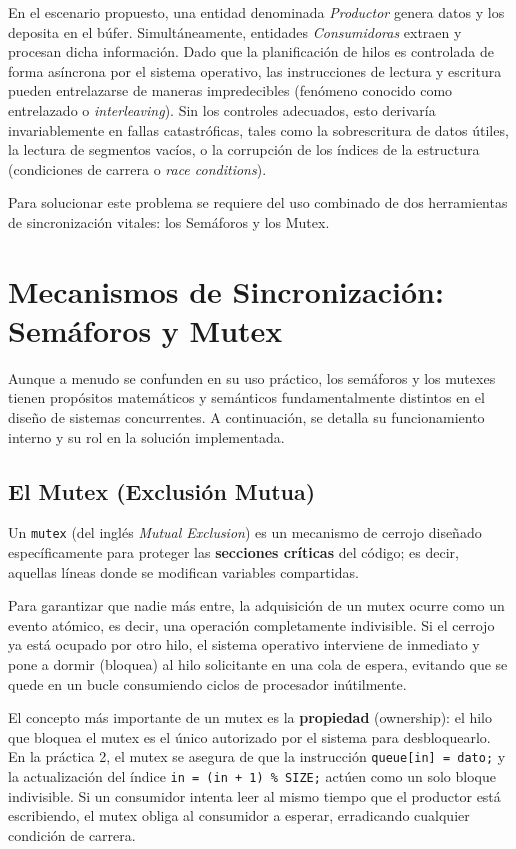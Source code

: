\documentclass[runningheads]{llncs}
\begin{document}
En el escenario propuesto, una entidad denominada \textit{Productor} genera datos y los deposita en el búfer. Simultáneamente, entidades \textit{Consumidoras} extraen y procesan dicha información. Dado que la planificación de hilos es controlada de forma asíncrona por el sistema operativo, las instrucciones de lectura y escritura pueden entrelazarse de maneras impredecibles (fenómeno conocido como entrelazado o \textit{interleaving}). Sin los controles adecuados, esto derivaría invariablemente en fallas catastróficas, tales como la sobrescritura de datos útiles, la lectura de segmentos vacíos, o la corrupción de los índices de la estructura (condiciones de carrera o \textit{race conditions}).

Para solucionar este problema se requiere del uso combinado de dos herramientas de sincronización vitales: los Semáforos y los Mutex.

\section{Mecanismos de Sincronización: Semáforos y Mutex}

Aunque a menudo se confunden en su uso práctico, los semáforos y los mutexes tienen propósitos matemáticos y semánticos fundamentalmente distintos en el diseño de sistemas concurrentes. A continuación, se detalla su funcionamiento interno y su rol en la solución implementada.

\subsection{El Mutex (Exclusión Mutua)}
Un \texttt{mutex} (del inglés \textit{Mutual Exclusion}) es un mecanismo de cerrojo diseñado específicamente para proteger las \textbf{secciones críticas} del código; es decir, aquellas líneas donde se modifican variables compartidas. 

Para garantizar que nadie más entre, la adquisición de un mutex ocurre como un evento atómico, es decir, una operación completamente indivisible. Si el cerrojo ya está ocupado por otro hilo, el sistema operativo interviene de inmediato y pone a dormir (bloquea) al hilo solicitante en una cola de espera, evitando que se quede en un bucle consumiendo ciclos de procesador inútilmente.

El concepto más importante de un mutex es la \textbf{propiedad} (ownership): el hilo que bloquea el mutex es el único autorizado por el sistema para desbloquearlo. En la práctica 2, el mutex se asegura de que la instrucción \texttt{queue[in] = dato;} y la actualización del índice \texttt{in = (in + 1) \% SIZE;} actúen como un solo bloque indivisible. Si un consumidor intenta leer al mismo tiempo que el productor está escribiendo, el mutex obliga al consumidor a esperar, erradicando cualquier condición de carrera.
\end{document}
